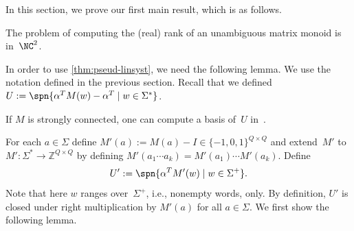 In this section, we prove our first main result, which is as follows.

\begin{thm} \label{thm:rank-in-NC}
The problem of computing the (real) rank of an unambiguous matrix monoid is in~$\NC^2$.
\end{thm}

\noindent
In order to use \autoref{thm:pseud-linsyst}, we need the following lemma. We use the notation defined in the previous section.
Recall that we defined $U := \spn{\alpha^T M(w) - \alpha^T \mid w \in \Sigma^*}$.

\begin{lem} \label{lem:U-in-NC}
If $M$ is strongly connected,
one can compute a basis of~$U$ in~\NCT.
\end{lem}

\noindent
For each $a \in \Sigma$ define $M'(a) := M(a) - I \in \{-1,0,1\}^{Q \times Q}$ and extend~$M'$ to $M' : \Sigma^* \to \mathbb{Z}^{Q \times Q}$ by defining $M'(a_1 \cdots a_k) = M'(a_1) \cdots M'(a_k)$.
Define \[U' := \spn{\alpha^T M'(w) \mid w \in \Sigma^+}.\]
Note that here $w$ ranges over~$\Sigma^+$, i.e., nonempty words, only. By definition, $U'$ is closed under right multiplication by $M'(a)$ for all $a \in \Sigma$.
We first show the following lemma.

